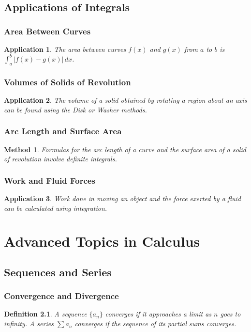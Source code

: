\documentclass[a4paper,12pt]{book}
\newtheorem{application}{Application}
\newtheorem{definition}{Definition}
\newtheorem{method}{Method}
\begin{document}
\section{Applications of Integrals}
\subsection{Area Between Curves}
\begin{application}
The area between curves \( f(x) \) and \( g(x) \) from \( a \) to \( b \) is \( \int_a^b |f(x) - g(x)| \, dx \).
\end{application}

\subsection{Volumes of Solids of Revolution}
\begin{application}
The volume of a solid obtained by rotating a region about an axis can be found using the Disk or Washer methods.
\end{application}

\subsection{Arc Length and Surface Area}
\begin{method}
Formulas for the arc length of a curve and the surface area of a solid of revolution involve definite integrals.
\end{method}

\subsection{Work and Fluid Forces}
\begin{application}
Work done in moving an object and the force exerted by a fluid can be calculated using integration.
\end{application}

\chapter{Advanced Topics in Calculus}
\section{Sequences and Series}
\subsection{Convergence and Divergence}
\begin{definition}
A sequence \( \{a_n\} \) converges if it approaches a limit as \( n \) goes to infinity. A series \( \sum a_n \) converges if the sequence of its partial sums converges.
\end{definition}
\end{document}
